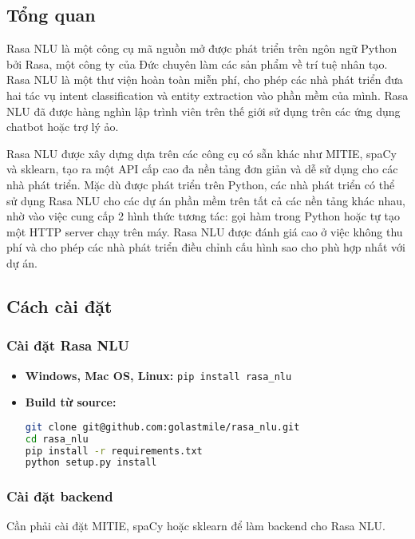 \subsection{Tổng quan}

Rasa NLU là một công cụ mã nguồn mở được phát triển trên ngôn ngữ Python bởi Rasa, một công ty của Đức chuyên làm các sản phẩm về trí tuệ nhân tạo. Rasa NLU là một thư viện hoàn toàn miễn phí, cho phép các nhà phát triển đưa hai tác vụ intent classification và entity extraction vào phần mềm của mình. Rasa NLU đã được hàng nghìn lập trình viên trên thế giới sử dụng trên các ứng dụng chatbot hoặc trợ lý ảo.

Rasa NLU được xây dựng dựa trên các công cụ có sẵn khác như MITIE, spaCy và sklearn, tạo ra một API cấp cao đa nền tảng đơn giản và dễ sử dụng cho các nhà phát triển. Mặc dù được phát triển trên Python, các nhà phát triển có thể sử dụng Rasa NLU cho các dự án phần mềm trên tất cả các nền tảng khác nhau, nhờ vào việc cung cấp 2 hình thức tương tác: gọi hàm trong Python hoặc tự tạo một HTTP server chạy trên máy. Rasa NLU được đánh giá cao ở việc không thu phí và cho phép các nhà phát triển điều chỉnh cấu hình sao cho phù hợp nhất với dự án.

\subsection{Cách cài đặt}

\subsubsection{Cài đặt Rasa NLU}

\begin{itemize}
    \item \textbf{Windows, Mac OS, Linux:} \lstinline[language=bash]{pip install rasa_nlu}
    \item \textbf{Build từ source:}
        \begin{lstlisting}[language=bash]
git clone git@github.com:golastmile/rasa_nlu.git
cd rasa_nlu
pip install -r requirements.txt
python setup.py install
        \end{lstlisting}
\end{itemize}

\subsubsection{Cài đặt backend}

Cần phải cài đặt MITIE, spaCy hoặc sklearn để làm backend cho Rasa NLU.


